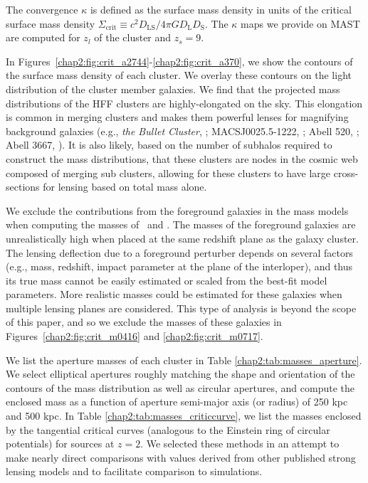 \noindent The convergence $\kappa$ is defined as the surface mass density in units of the critical surface mass density $\Sigma_\mathrm{crit}\equiv c^2 D_\mathrm{LS}/4\pi G D_\mathrm{L} D_\mathrm{S}$. The $\kappa$ maps we provide on MAST are computed for $z_l$ of the cluster and $z_s=9$.


In Figures~\ref{chap2:fig:crit_a2744}-\ref{chap2:fig:crit_a370}, we show the contours of the surface mass density of each cluster. We overlay these contours on the light distribution of the cluster member galaxies. We find that the projected mass distributions of the HFF clusters are highly-elongated on the sky. This elongation is common in merging clusters and makes them powerful lenses for magnifying background galaxies (e.g., \textit{the Bullet Cluster}, \citet{Clowe:2006fj,Clowe:2004uq}; MACSJ0025.5-1222, \citet{Bradac:2008kx}; Abell 520, \citet{Clowe:2012vn}; Abell 3667, \citet{Joffre:2000yq}). It is also likely, based on the number of subhalos required to construct the mass distributions, that these clusters are nodes in the cosmic web \citep{Limousin:2012fj,Jauzac:2012ab,Ma:2009gf,Ebeling:2004ai} composed of merging sub clusters, allowing for these clusters to have large cross-sections for lensing based on total mass alone.

We exclude the contributions from the foreground galaxies in the mass models when computing the masses of \MACSzerofour\ and \MACSzeroseven. The masses of the foreground galaxies are unrealistically high when placed at the same redshift plane as the galaxy cluster. The lensing deflection due to a foreground perturber depends on several factors (e.g., mass, redshift, impact parameter at the plane of the interloper), and thus its true mass cannot be easily estimated or scaled from the best-fit model parameters. More realistic masses could be estimated for these galaxies when multiple lensing planes are considered. This type of analysis is beyond the scope of this paper, and so we exclude the masses of these galaxies in Figures~\ref{chap2:fig:crit_m0416} and \ref{chap2:fig:crit_m0717}.

We list the aperture masses of each cluster in Table \ref{chap2:tab:masses_aperture}. We select elliptical apertures roughly matching the shape and orientation of the contours of the mass distribution as well as circular apertures, and compute the enclosed mass as a function of aperture semi-major axis (or radius) of 250 kpc and 500 kpc. In Table \ref{chap2:tab:masses_criticcurve}, we list the masses enclosed by the tangential critical curves (analogous to the Einstein ring of circular potentials) for sources at $z=2$. We selected these methods in an attempt to make nearly direct comparisons with values derived from other published strong lensing models and to facilitate comparison to simulations. 

